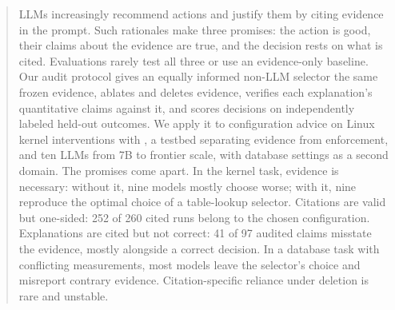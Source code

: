 \begin{abstract}
LLMs increasingly recommend actions and justify them by citing evidence in the prompt. Such rationales make three promises: the action is good, their claims about the evidence are true, and the decision rests on what is cited. Evaluations rarely test all three or use an evidence-only baseline. Our audit protocol gives an equally informed non-LLM selector the same frozen evidence, ablates and deletes evidence, verifies each explanation's quantitative claims against it, and scores decisions on independently labeled held-out outcomes. We apply it to configuration advice on Linux kernel interventions with \sysname, a testbed separating evidence from enforcement, and ten LLMs from 7B to frontier scale, with database settings as a second domain. The promises come apart. In the kernel task, evidence is necessary: without it, nine models mostly choose worse; with it, nine reproduce the optimal choice of a table-lookup selector. Citations are valid but one-sided: 252 of 260 cited runs belong to the chosen configuration. Explanations are cited but not correct: 41 of 97 audited claims misstate the evidence, mostly alongside a correct decision. In a database task with conflicting measurements, most models leave the selector's choice and misreport contrary evidence. Citation-specific reliance under deletion is rare and unstable.
\end{abstract}
